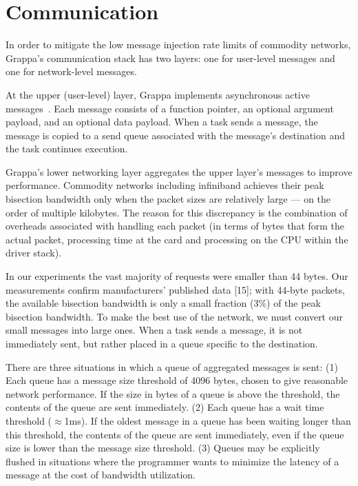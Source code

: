 \section{Communication}\label{sec:communication}

In order to mitigate the low message injection rate limits of commodity
networks, Grappa's communication stack has two layers: one for user-level
messages and one for network-level messages.

At the upper (user-level) layer, Grappa implements asynchronous active
messages~\cite{vonEicken92}. Each message consists of a function pointer, an
optional argument payload, and an optional data payload. When a task sends a
message, the message is copied to a send queue associated with the message's
destination and the task continues execution.

Grappa’s lower networking layer aggregates the upper layer’s messages to
improve performance. Commodity networks including infiniband achieves their
peak bisection bandwidth only when the packet sizes are relatively large ---
on the order of multiple kilobytes. The reason for this discrepancy is the
combination of overheads associated with handling each packet (in terms of
bytes that form the actual packet, processing time at the card and processing
on the CPU within the driver stack).

In our experiments the vast majority of requests were smaller than 44 bytes.
Our measurements confirm manufacturers' published data [15]; with 44-byte
packets, the available bisection bandwidth is only a small fraction (3\%) of
the peak bisection bandwidth. To make the best use of the network, we must
convert our small messages into large ones. When a task sends a message, it is
not immediately sent, but rather placed in a queue specific to the
destination.

There are three situations in which a queue of aggregated messages is sent:
(1) Each queue has a message size threshold of 4096 bytes, chosen to give
reasonable network performance. If the size in bytes of a queue is above the
threshold, the contents of the queue are sent immediately. (2) Each queue
has a wait time threshold ($\approx${1ms}). If the oldest message in a queue
has been waiting longer than this threshold, the contents of the queue are
sent immediately, even if the queue size is lower than the message size
threshold. (3) Queues may be explicitly flushed in situations where the
programmer wants to minimize the latency of a message at the cost of bandwidth
utilization.

